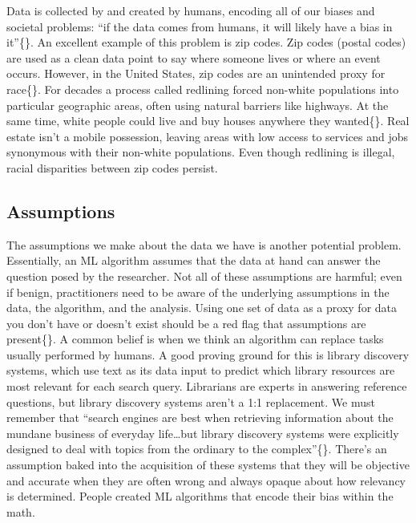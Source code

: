 \documentclass[
  krantz2]{krantz}
\begin{document}
Data is collected by and created by humans, encoding all of our biases and societal problems: ``if the data comes from humans, it will likely have a bias in it''\{\citet{shane2019}\}. An excellent example of this problem is zip codes. Zip codes (postal codes) are used as a clean data point to say where someone lives or where an event occurs. However, in the United States, zip codes are an unintended proxy for race\{\citet{oneil2016}\}. For decades a process called redlining forced non-white populations into particular geographic areas, often using natural barriers like highways. At the same time, white people could live and buy houses anywhere they wanted\{\citet{rothstein2017}\}. Real estate isn't a mobile possession, leaving areas with low access to services and jobs synonymous with their non-white populations. Even though redlining is illegal, racial disparities between zip codes persist.

\hypertarget{assumptions}{%
\subsection{Assumptions}\label{assumptions}}

The assumptions we make about the data we have is another potential problem. Essentially, an ML algorithm assumes that the data at hand can answer the question posed by the researcher. Not all of these assumptions are harmful; even if benign, practitioners need to be aware of the underlying assumptions in the data, the algorithm, and the analysis. Using one set of data as a proxy for data you don't have or doesn't exist should be a red flag that assumptions are present\{\citet{oneil2016}\}. A common belief is when we think an algorithm can replace tasks usually performed by humans. A good proving ground for this is library discovery systems, which use text as its data input to predict which library resources are most relevant for each search query. Librarians are experts in answering reference questions, but library discovery systems aren't a 1:1 replacement. We must remember that ``search engines are best when retrieving information about the mundane business of everyday life\ldots but library discovery systems were explicitly designed to deal with topics from the ordinary to the complex''\{\citet{reidsma2019}\}. There's an assumption baked into the acquisition of these systems that they will be objective and accurate when they are often wrong and always opaque about how relevancy is determined. People created ML algorithms that encode their bias within the math.
\end{document}

